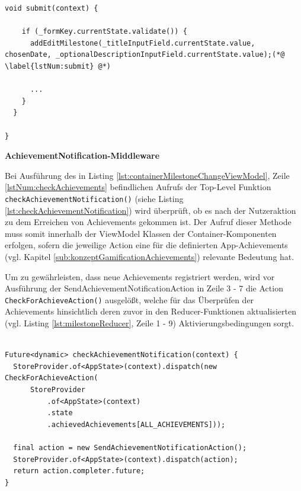 \documentclass[bibliography=totoc,listof=totoc,BCOR=5mm,DIV=12,oneside]{scrbook}
\begin{document}
\bigskip
\begin{lstlisting}[caption={Methode: Bestätigung einer Meilensteinänderung },captionpos=b, label=lst:submitMilestoneChange]
void submit(context) {

    if (_formKey.currentState.validate()) {
      addEditMilestone(_titleInputField.currentState.value, chosenDate, _optionalDescriptionInputField.currentState.value);(*@ \label{lstNum:submit} @*)

      ...
    }
  }
  
}
\end{lstlisting}


\par \bigskip \textbf{AchievementNotification-Middleware}
\par Bei Ausführung des in Listing \ref{lst:containerMilestoneChangeViewModel}, Zeile \ref{lstNum:checkAchievements} befindlichen Aufrufs der Top-Level Funktion \texttt{checkAchievementNotification()} (siehe Listing \ref{lst:checkAchievementNotification}) wird überprüft, ob es nach der Nutzeraktion zu dem Erreichen von Achievements gekommen ist. Der Aufruf dieser Methode muss somit innerhalb der ViewModel Klassen der Container-Komponenten erfolgen, sofern die jeweilige Action eine für die definierten App-Achievements (vgl. Kapitel \ref{sub:konzeptGamificationAchievements}) relevante Bedeutung hat.

\par \bigskip Um zu gewährleisten, dass neue Achievements registriert werden, wird vor Ausführung der SendAchievementNotificationAction in Zeile 3 - 7 die Action \texttt{CheckForAchieveAction()} ausgelößt, welche für das Überprüfen der Achievements hinsichtlich deren zuvor in den Reducer-Funktionen aktualisierten (vgl. Listing \ref{lst:milestoneReducer}, Zeile 1 - 9) Aktivierungsbedingungen sorgt.

\bigskip
\begin{lstlisting}[caption={Methode: checkAchievementNotification},captionpos=b, label=lst:checkAchievementNotification]

Future<dynamic> checkAchievementNotification(context) {
  StoreProvider.of<AppState>(context).dispatch(new CheckForAchieveAction(
      StoreProvider
          .of<AppState>(context)
          .state
          .achievedAchievements[ALL_ACHIEVEMENTS]));

  final action = new SendAchievementNotificationAction();
  StoreProvider.of<AppState>(context).dispatch(action);
  return action.completer.future;
}
\end{lstlisting}
\bigskip
\end{document}
